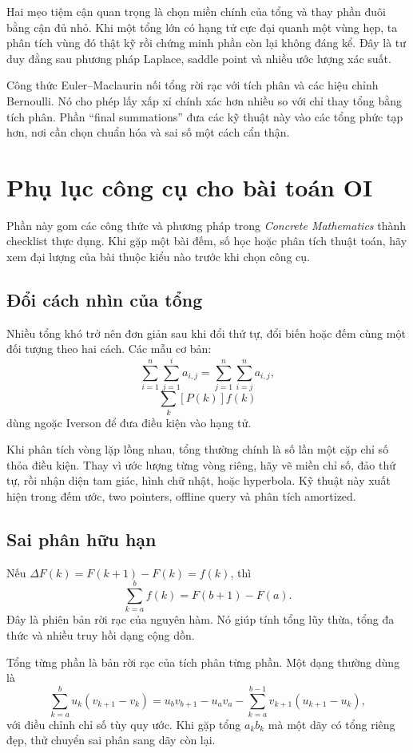 \documentclass[11pt]{article}
\begin{document}
Hai mẹo tiệm cận quan trọng là chọn miền chính của tổng và thay phần đuôi bằng
cận đủ nhỏ. Khi một tổng lớn có hạng tử cực đại quanh một vùng hẹp, ta phân
tích vùng đó thật kỹ rồi chứng minh phần còn lại không đáng kể. Đây là tư duy
đằng sau phương pháp Laplace, saddle point và nhiều ước lượng xác suất.

Công thức Euler--Maclaurin nối tổng rời rạc với tích phân và các hiệu chỉnh
Bernoulli. Nó cho phép lấy xấp xỉ chính xác hơn nhiều so với chỉ thay tổng bằng
tích phân. Phần ``final summations'' đưa các kỹ thuật này vào các tổng phức tạp
hơn, nơi cần chọn chuẩn hóa và sai số một cách cẩn thận.

\section{Phụ lục công cụ cho bài toán OI}

Phần này gom các công thức và phương pháp trong \emph{Concrete Mathematics}
thành checklist thực dụng. Khi gặp một bài đếm, số học hoặc phân tích thuật
toán, hãy xem đại lượng của bài thuộc kiểu nào trước khi chọn công cụ.

\subsection{Đổi cách nhìn của tổng}

Nhiều tổng khó trở nên đơn giản sau khi đổi thứ tự, đổi biến hoặc đếm cùng một
đối tượng theo hai cách. Các mẫu cơ bản:
\[
  \sum_{i=1}^n\sum_{j=1}^i a_{i,j}
  =\sum_{j=1}^n\sum_{i=j}^n a_{i,j},
\]
\[
  \sum_{k} [P(k)] f(k)
\]
dùng ngoặc Iverson để đưa điều kiện vào hạng tử.

Khi phân tích vòng lặp lồng nhau, tổng thường chính là số lần một cặp chỉ số
thỏa điều kiện. Thay vì ước lượng từng vòng riêng, hãy vẽ miền chỉ số, đảo thứ
tự, rồi nhận diện tam giác, hình chữ nhật, hoặc hyperbola. Kỹ thuật này xuất
hiện trong đếm ước, two pointers, offline query và phân tích amortized.

\subsection{Sai phân hữu hạn}

Nếu \(\Delta F(k)=F(k+1)-F(k)=f(k)\), thì
\[
  \sum_{k=a}^{b} f(k)=F(b+1)-F(a).
\]
Đây là phiên bản rời rạc của nguyên hàm. Nó giúp tính tổng lũy thừa, tổng đa
thức và nhiều truy hồi dạng cộng dồn.

Tổng từng phần là bản rời rạc của tích phân từng phần. Một dạng thường dùng là
\[
  \sum_{k=a}^{b} u_k(v_{k+1}-v_k)
  = u_{b}v_{b+1}-u_a v_a-\sum_{k=a}^{b-1}v_{k+1}(u_{k+1}-u_k),
\]
với điều chỉnh chỉ số tùy quy ước. Khi gặp tổng \(a_k b_k\) mà một dãy có tổng
riêng đẹp, thử chuyển sai phân sang dãy còn lại.
\end{document}
